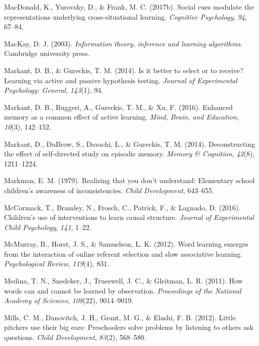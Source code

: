 \documentclass[oneside]{report}
\begin{document}
\hypertarget{ref-macdonald2017social}{}
MacDonald, K., Yurovsky, D., \& Frank, M. C. (2017b). Social cues
modulate the representations underlying cross-situational learning.
\emph{Cognitive Psychology}, \emph{94}, 67--84.

\hypertarget{ref-mackay2003information}{}
MacKay, D. J. (2003). \emph{Information theory, inference and learning
algorithms}. Cambridge university press.

\hypertarget{ref-markant2014better}{}
Markant, D. B., \& Gureckis, T. M. (2014). Is it better to select or to
receive? Learning via active and passive hypothesis testing.
\emph{Journal of Experimental Psychology: General}, \emph{143}(1), 94.

\hypertarget{ref-markant2016enhanced}{}
Markant, D. B., Ruggeri, A., Gureckis, T. M., \& Xu, F. (2016). Enhanced
memory as a common effect of active learning. \emph{Mind, Brain, and
Education}, \emph{10}(3), 142--152.

\hypertarget{ref-markant2014deconstructing}{}
Markant, D., DuBrow, S., Davachi, L., \& Gureckis, T. M. (2014).
Deconstructing the effect of self-directed study on episodic memory.
\emph{Memory \& Cognition}, \emph{42}(8), 1211--1224.

\hypertarget{ref-markman1979realizing}{}
Markman, E. M. (1979). Realizing that you don't understand: Elementary
school children's awareness of inconsistencies. \emph{Child
Development}, 643--655.

\hypertarget{ref-mccormack2016children}{}
McCormack, T., Bramley, N., Frosch, C., Patrick, F., \& Lagnado, D.
(2016). Children's use of interventions to learn causal structure.
\emph{Journal of Experimental Child Psychology}, \emph{141}, 1--22.

\hypertarget{ref-mcmurray2012word}{}
McMurray, B., Horst, J. S., \& Samuelson, L. K. (2012). Word learning
emerges from the interaction of online referent selection and slow
associative learning. \emph{Psychological Review}, \emph{119}(4), 831.

\hypertarget{ref-medina2011words}{}
Medina, T. N., Snedeker, J., Trueswell, J. C., \& Gleitman, L. R.
(2011). How words can and cannot be learned by observation.
\emph{Proceedings of the National Academy of Sciences}, \emph{108}(22),
9014--9019.

\hypertarget{ref-mills2012little}{}
Mills, C. M., Danovitch, J. H., Grant, M. G., \& Elashi, F. B. (2012).
Little pitchers use their big ears: Preschoolers solve problems by
listening to others ask questions. \emph{Child Development},
\emph{83}(2), 568--580.
\end{document}
